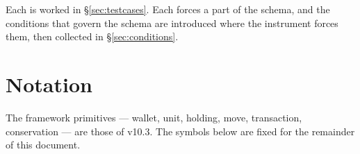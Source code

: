 \documentclass[11pt,a4paper]{article}
\begin{document}
\noindent Each is worked in \S\ref{sec:testcases}. Each forces a part of the schema, and
the conditions that govern the schema are introduced where the instrument forces them, then
collected in \S\ref{sec:conditions}.

\section{Notation}
\label{sec:notation}

The framework primitives --- wallet, unit, holding, move, transaction, conservation ---
are those of v10.3. The symbols below are fixed for the remainder of this document.
\end{document}
